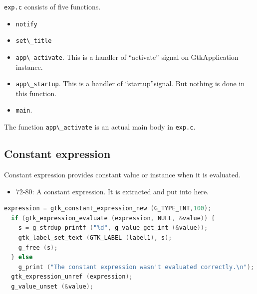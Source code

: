\passthrough{\lstinline!exp.c!} consists of five functions.

\begin{itemize}
\tightlist
\item
  \passthrough{\lstinline!notify!}
\item
  \passthrough{\lstinline!set\_title!}
\item
  \passthrough{\lstinline!app\_activate!}. This is a handler of
  ``activate'' signal on GtkApplication instance.
\item
  \passthrough{\lstinline!app\_startup!}. This is a handler of
  ``startup''signal. But nothing is done in this function.
\item
  \passthrough{\lstinline!main!}.
\end{itemize}

The function \passthrough{\lstinline!app\_activate!} is an actual main
body in \passthrough{\lstinline!exp.c!}.

\hypertarget{constant-expression}{%
\subsection{Constant expression}\label{constant-expression}}

Constant expression provides constant value or instance when it is
evaluated.

\begin{itemize}
\tightlist
\item
  72-80: A constant expression. It is extracted and put into here.
\end{itemize}

\begin{lstlisting}[language=C]
  expression = gtk_constant_expression_new (G_TYPE_INT,100);
  if (gtk_expression_evaluate (expression, NULL, &value)) {
    s = g_strdup_printf ("%d", g_value_get_int (&value));
    gtk_label_set_text (GTK_LABEL (label1), s);
    g_free (s);
  } else
    g_print ("The constant expression wasn't evaluated correctly.\n");
  gtk_expression_unref (expression);
  g_value_unset (&value);
\end{lstlisting}

